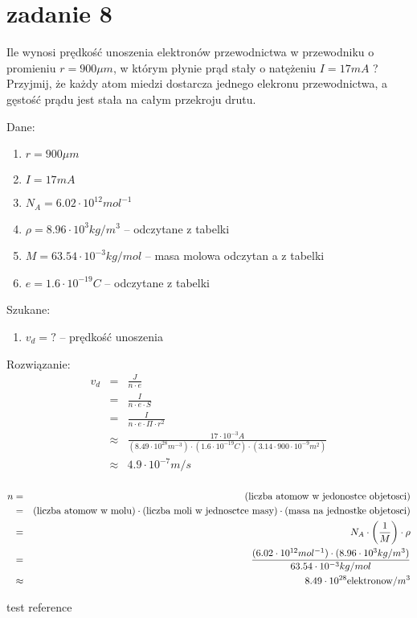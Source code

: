 \documentclass[svgnames]{report}
\begin{document}
\section{zadanie 8}
\begin{framed}
Ile wynosi prędkość unoszenia elektronów przewodnictwa w przewodniku o promieniu $r = 900 \mu m$, w którym płynie prąd stały o natężeniu $I = 17 mA$ ?
Przyjmij, że każdy atom miedzi dostarcza jednego elekronu przewodnictwa, a gęstość prądu jest stała na całym przekroju drutu.
\end{framed}
Dane:
\begin{enumerate}
	\item $r = 900 \mu m$
	\item $I = 17 mA$
	\item $N_A = 6.02 \cdot 10^{12} mol^{-1}$
	\item $\rho = 8.96 \cdot 10^3 kg/m^3$ -- odczytane z tabelki
	\item $M = 63.54 \cdot 10^{-3} kg/mol$ -- masa molowa odczytan a z tabelki
	\item $e = 1.6 \cdot 10^{-19} C$ -- odczytane z tabelki
\end{enumerate}
Szukane:
\begin{enumerate}
	\item $v_d = ?$ -- prędkość unoszenia
\end{enumerate}
Rozwiązanie:
\begin{eqnarray*}
v_d 	&=& \frac{J}{n \cdot e}	\\
		&=&	\frac{I}{n \cdot e \cdot S}	\\
		&=&	\frac{I}{n \cdot e \cdot \Pi \cdot r^2}	\\
		& \approx & \frac{17 \cdot 10^{-3} A}{(8.49 \cdot 10^{28} m^{-3}) \cdot (1.6 \cdot 10^{-19} C) \cdot (3.14 \cdot 900 \cdot 10^{-9} m^2)}	\\
		& \approx & 4.9 \cdot 10^{-7} m/s	\\
\end{eqnarray*}

\begin{eqnarray*}
n 	&=&	\hbox{(liczba atomow w jedonostce objetosci)}	\\
	&=&	\hbox{(liczba atomow w molu)} \cdot \hbox{(liczba moli w jednosctce masy)} \cdot \hbox{(masa na jednostke objetosci)}	\\
	&=&	N_A \cdot \left( \frac{1}{M} \right) \cdot \rho	\\
	&=& \frac{(6.02 \cdot 10^{12} mol^{-1}) \cdot (8.96 \cdot 10^3 kg/m^3)}{63.54 \cdot 10^{-3} kg/mol}	\\
	& \approx & 8.49 \cdot 10^{28} \hbox{elektronow}/m^3	\\
\end{eqnarray*}

\begin{thebibliography}{99}
 test reference
\end{thebibliography}
\end{document}
